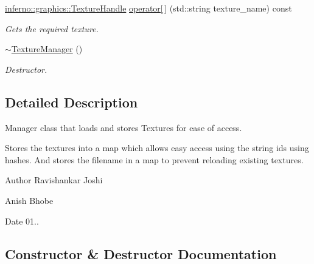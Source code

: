 \begin{DoxyCompactItemize}
\mbox{\hyperlink{namespaceinferno_1_1graphics_a9d719bfbfedd17b9ace9b8d603ab5a38}{inferno\+::graphics\+::\+Texture\+Handle}} \mbox{\hyperlink{classinferno_1_1graphics_1_1_texture_manager_a419b62740d0cbff686820b9b4ccc95e2}{operator\mbox{[}$\,$\mbox{]}}} (std\+::string texture\+\_\+name) const
\begin{DoxyCompactList}\small\item\em Gets the required texture. \end{DoxyCompactList}\item 
\mbox{\label{classinferno_1_1graphics_1_1_texture_manager_a41c136bc37abea48c23ed8f6c863b63f}} 
\mbox{\hyperlink{classinferno_1_1graphics_1_1_texture_manager_a41c136bc37abea48c23ed8f6c863b63f}{$\sim$\+Texture\+Manager}} ()
\begin{DoxyCompactList}\small\item\em Destructor. \end{DoxyCompactList}\end{DoxyCompactItemize}


\subsection{Detailed Description}
Manager class that loads and stores Textures for ease of access. 

Stores the textures into a map which allows easy access using the string ids using hashes. And stores the filename in a map to prevent reloading existing textures. \begin{DoxyAuthor}{Author}
Ravishankar Joshi 

Anish Bhobe 
\end{DoxyAuthor}
\begin{DoxyDate}{Date}
01.. 
\end{DoxyDate}


\subsection{Constructor \& Destructor Documentation}
\mbox{\label{classinferno_1_1graphics_1_1_texture_manager_a06e141712b3786bae5100da3e04aff92}} 
